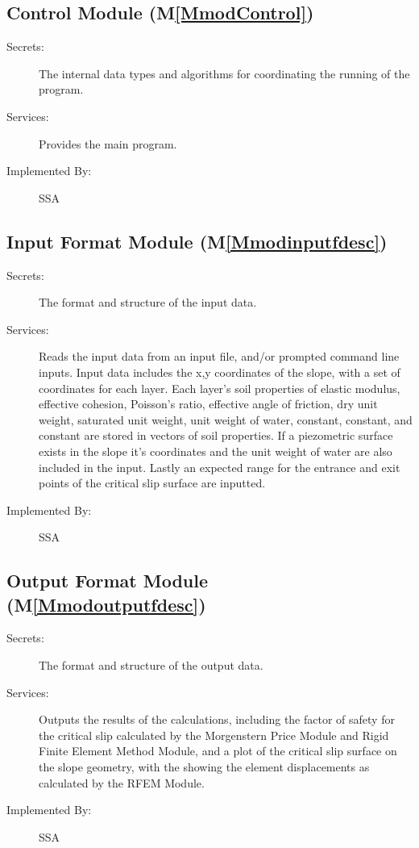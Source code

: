 \documentclass[12pt]{article}
\begin{document}
\subsection{Control Module (M\ref{MmodControl})}
\label{Sec:ContModu()}
\begin{description}
\item[Secrets:]The internal data types and algorithms for coordinating the running of the program.
\item[Services:]Provides the main program.
\item[Implemented By:]SSA
\end{description}
\subsection{Input Format Module (M\ref{Mmodinputfdesc})}
\label{Sec:InpuFormModu()}
\begin{description}
\item[Secrets:]The format and structure of the input data.
\item[Services:]Reads the input data from an input file, and/or prompted command line inputs. Input data includes the x,y coordinates of the slope, with a set of coordinates for each layer. Each layer's soil properties of elastic modulus, effective cohesion, Poisson's ratio, effective angle of friction, dry unit weight, saturated unit weight, unit weight of water, constant, constant, and constant are stored in vectors of soil properties. If a piezometric surface exists in the slope it's coordinates and the unit weight of water are also included in the input. Lastly an expected range for the entrance and exit points of the critical slip surface are inputted.
\item[Implemented By:]SSA
\end{description}
\subsection{Output Format Module (M\ref{Mmodoutputfdesc})}
\label{Sec:OutpFormModu()}
\begin{description}
\item[Secrets:]The format and structure of the output data.
\item[Services:]Outputs the results of the calculations, including the factor of safety for the critical slip calculated by the Morgenstern Price Module and Rigid Finite Element Method Module, and a plot of the critical slip surface on the slope geometry, with the showing the element displacements as calculated by the RFEM Module.
\item[Implemented By:]SSA
\end{description}
\end{document}
